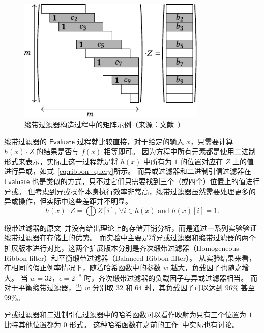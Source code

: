 \begin{figure}[ht]
  \centering
  \includegraphics[width=0.8\textwidth]{figures/ribbon_filter_construction.pdf}
  \caption{缎带过滤器构造过程中的矩阵示例（来源：文献~\cite{dillinger2021ribbon}）}
  \label{fig:ribbon_construc}
\end{figure}

缎带过滤器的 $\mathsf{Evaluate}$ 过程就比较直接，对于给定的输入 $x$，只需要计算 $h(x)\cdot Z$ 的结果是否与 $f(x)$ 相等即可。
因为方程中所有元素都是使用二进制形式来表示，实际上这一过程就是将 $h(x)$ 中所有为 $1$ 的位置对应在 $Z$ 上的值进行异或，如式~\ref{eq:ribbon_query}所示。
而异或过滤器和二进制引信过滤器在 $\mathsf{Evaluate}$ 也是类似的方式，只不过它们只需要找到三个（或四个）位置上的值进行异或。
但考虑到异或操作本身执行效率非常高，缎带过滤器虽然需要处理更多的异或操作，但实际中这些差距并不明显。
\begin{equation}
  h(x) \cdot Z = \bigoplus Z[i] \mbox{, } \forall i \in h(x) \mbox{ and } h(x)[i] = 1.
  \label{eq:ribbon_query}
\end{equation}

缎带过滤器的原文~\cite{dillinger2021ribbon}并没有给出理论上的存储开销分析，而是通过一系列实验验证缎带过滤器在存储上的优势。
而实验中主要是将异或过滤器和缎带过滤器的两个扩展版本进行对比，这两个扩展版本分别是齐次缎带过滤器（Homogeneous Ribbon filter）和平衡缎带过滤器（Balanced Ribbon filter）。
从实验结果来看，在相同的假正例率情况下，随着哈希函数中的参数 $w$ 越大，负载因子也随之增大。
当 $w=32$，$\epsilon=2^{-8}$ 时，齐次缎带过滤器的负载因子与异或过滤器相当。
而对于平衡缎带过滤器，当 $w$ 分别取 $32$ 和 $64$ 时，其负载因子可以达到 $96\%$ 甚至 $99\%$。


异或过滤器和二进制引信过滤器中的哈希函数可以看作映射为只有三个位置为 $1$ 比特其他位置都为 $0$ 形式。
这种哈希函数在之前的工作~\cite{botelho2013Practical,genuzio2016Fast}中实际也有讨论。

